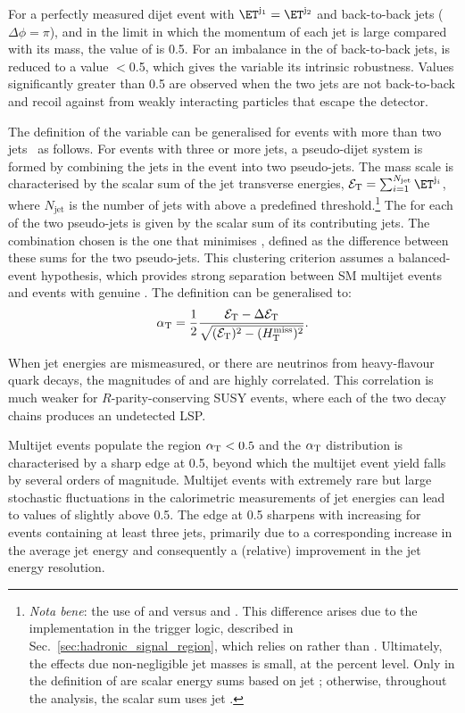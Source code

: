 For a perfectly measured dijet event with $\ET^{\mathrm{j_1}} =
\ET^{\mathrm{j_2}}$ and back-to-back jets ($\Delta\phi = \pi$), and in
the limit in which the momentum of each jet is large compared with its
mass, the value of \alphat is 0.5. For an imbalance in the \ET of
back-to-back jets, \alphat is reduced to a value $<$0.5, which gives
the variable its intrinsic robustness. Values significantly greater
than 0.5 are observed when the two jets are not back-to-back and
recoil against \ptvecmiss from weakly interacting particles that
escape the detector.

The definition of the \alphat variable can be generalised for events
with more than two jets~\cite{Khachatryan:2011tk} as follows. For
events with three or more jets, a pseudo-dijet system is formed by
combining the jets in the event into two pseudo-jets. The mass scale
is characterised by the scalar sum of the jet transverse energies,
$\scalst = \sum_{i=1}^{N_\text{jet}} \ET^{\mathrm{j}_i}$, where
$N_\text{jet}$ is the number of jets with \ET above a predefined
threshold.\footnote{{\it Nota bene}: the use of \Et and \scalst versus
  \Pt and \scalht. This difference arises due to the implementation in
  the trigger logic, described in
  Sec.~\ref{sec:hadronic_signal_region}, which relies on \Et rather
  than \Pt. Ultimately, the effects due non-negligible jet masses is
  small, at the percent level. Only in the definition of \alphat are
  scalar energy sums based on jet \Et; otherwise, throughout the
  analysis, the scalar sum \scalht uses jet \Pt.} The \scalst for each
of the two pseudo-jets is given by the scalar \ET sum of its
contributing jets. The combination chosen is the one that minimises
\dst, defined as the difference between these sums for the two
pseudo-jets.  This clustering criterion assumes a balanced-event
hypothesis, which provides strong separation between SM multijet
events and events with genuine \ptvecmiss. The \alphat definition can
be generalised to:
\begin{equation}
  \label{eq:alphat}
  \alpha_{\text{T}} = \frac{1}{2} \frac{\mathcal{E}_\mathrm{T} -
    \Delta\mathcal{E}_\mathrm{T}}{\sqrt{(\mathcal{E}_\mathrm{T})^2 - (\mbox{$H_{\rm T}^{\rm miss}$})^2}}.
\end{equation}

When jet energies are mismeasured, or there are neutrinos from
heavy-flavour quark decays, the magnitudes of \HTmiss and \dst are
highly correlated. This correlation is much weaker for
$R$-parity-conserving SUSY events, where each of the two decay chains
produces an undetected LSP.

Multijet events populate the region $\alpha_{\text{T}}< 0.5$ and the $\alpha_{\text{T}}$
distribution is characterised by a sharp edge at 0.5, beyond which the
multijet event yield falls by several orders of magnitude. Multijet
events with extremely rare but large stochastic fluctuations in the
calorimetric measurements of jet energies can lead to values of
\alphat slightly above 0.5. The edge at 0.5 sharpens with increasing
\scalht for events containing at least three jets, primarily due to a
corresponding increase in the average jet energy and consequently a
(relative) improvement in the jet energy resolution.

